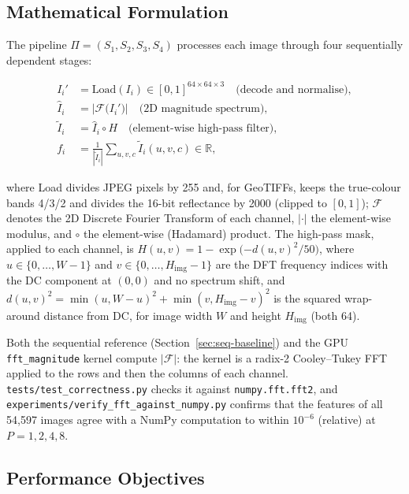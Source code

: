 \documentclass[a4paper,12pt]{report}
\begin{document}
\subsection{Mathematical Formulation}

The pipeline $\Pi = (S_1, S_2, S_3, S_4)$ processes each image through
four sequentially dependent stages:

\begin{align}
  I_i' &= \text{Load}(I_i) \in [0,1]^{64\times64\times3}
         \quad\text{(decode and normalise)}, \label{eq:s1}\\
  \hat{I}_i &= \bigl|\mathcal{F}\bigl(I_i'\bigr)\bigr|
         \quad\text{(2D magnitude spectrum)}, \label{eq:s2}\\
  \tilde{I}_i &= \hat{I}_i \circ H
         \quad\text{(element-wise high-pass filter)}, \label{eq:s3}\\
  f_i &= \frac{1}{|\tilde{I}_i|}\sum_{u,v,c}\tilde{I}_i(u,v,c)
         \in\mathbb{R}, \label{eq:s4}
\end{align}

\noindent where Load divides JPEG pixels by 255 and, for GeoTIFFs,
keeps the true-colour bands 4/3/2 and divides the 16-bit reflectance by
2000 (clipped to $[0,1]$); $\mathcal{F}$ denotes the 2D Discrete Fourier Transform
of each channel, $|\cdot|$ the element-wise modulus, and
$\circ$ the element-wise (Hadamard) product. The high-pass mask, applied to
each channel, is
$H(u,v) = 1 - \exp\!\bigl({-d(u,v)^2/50}\bigr)$, where
$u\in\{0,\ldots,W{-}1\}$ and $v\in\{0,\ldots,H_{\mathrm{img}}{-}1\}$ are the
DFT frequency indices with the DC component at $(0,0)$ and no spectrum shift,
and $d(u,v)^2 = \min(u,W{-}u)^2 + \min(v,H_{\mathrm{img}}{-}v)^2$ is the squared
wrap-around distance from DC, for image width $W$ and height $H_{\mathrm{img}}$
(both 64).

\noindent Both the sequential reference
(Section~\ref{sec:seq-baseline}) and the GPU
\texttt{fft\_\discretionary{}{}{}magnitude} kernel compute $|\mathcal{F}|$: the kernel
is a radix-2 Cooley--Tukey FFT applied to the rows and then the columns
of each channel. \texttt{tests\slash{}test\_\discretionary{}{}{}correctness.py} checks it
against \texttt{numpy.fft.fft2}, and
\texttt{experiments\slash{}verify\_\discretionary{}{}{}fft\_\discretionary{}{}{}against\_\discretionary{}{}{}numpy.py}
confirms that the features of all 54{,}597 images agree with a NumPy
computation to within $10^{-6}$ (relative) at $P=1,2,4,8$.

\subsection{Performance Objectives}
\end{document}
